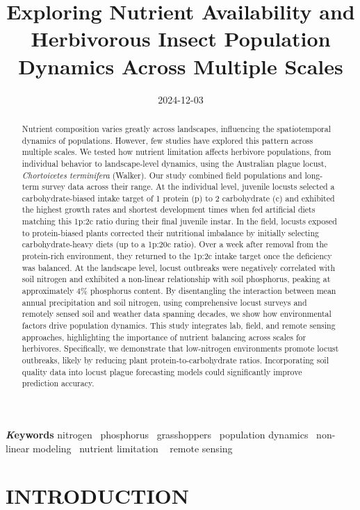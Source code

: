 \documentclass[
]{article}
\title{Exploring Nutrient Availability and Herbivorous Insect Population
Dynamics Across Multiple Scales}
\author{\asep\asep\asep\asep\asep\asep\asep\asep\asep}
\date{2024-12-03}
\begin{document}
\maketitle
\begin{abstract}
Nutrient composition varies greatly across landscapes, influencing the
spatiotemporal dynamics of populations. However, few studies have
explored this pattern across multiple scales. We tested how nutrient
limitation affects herbivore populations, from individual behavior to
landscape-level dynamics, using the Australian plague locust,
\emph{Chortoicetes terminifera} (Walker). Our study combined field
populations and long-term survey data across their range. At the
individual level, juvenile locusts selected a carbohydrate-biased intake
target of 1 protein (p) to 2 carbohydrate (c) and exhibited the highest
growth rates and shortest development times when fed artificial diets
matching this 1p:2c ratio during their final juvenile instar. In the
field, locusts exposed to protein-biased plants corrected their
nutritional imbalance by initially selecting carbohydrate-heavy diets
(up to a 1p:20c ratio). Over a week after removal from the protein-rich
environment, they returned to the 1p:2c intake target once the
deficiency was balanced. At the landscape level, locust outbreaks were
negatively correlated with soil nitrogen and exhibited a non-linear
relationship with soil phosphorus, peaking at approximately 4\%
phosphorus content. By disentangling the interaction between mean annual
precipitation and soil nitrogen, using comprehensive locust surveys and
remotely sensed soil and weather data spanning decades, we show how
environmental factors drive population dynamics. This study integrates
lab, field, and remote sensing approaches, highlighting the importance
of nutrient balancing across scales for herbivores. Specifically, we
demonstrate that low-nitrogen environments promote locust outbreaks,
likely by reducing plant protein-to-carbohydrate ratios. Incorporating
soil quality data into locust plague forecasting models could
significantly improve prediction accuracy.
\end{abstract}
{\bfseries \emph Keywords}
\def\sep{\textbullet\ }
nitrogen \sep phosphorus \sep grasshoppers \sep population
dynamics \sep non-linear modeling \sep nutrient limitation \sep 
remote sensing



\section{INTRODUCTION}\label{introduction}
\end{document}
